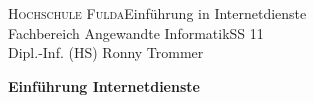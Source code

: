 \documentclass[a4paper,11pt]{article}
\begin{document}

\textsc{Hochschule Fulda}{\small\hfill Einführung in Internetdienste}\\
{\small Fachbereich Angewandte Informatik{\small\hfill SS 11}\\
Dipl.-Inf. (HS) Ronny Trommer}\\

\begin{center}
{\Large\textbf{Einführung Internetdienste}}\\

\medskip
\end{center}

\smallskip

\newcommand{\half}{{\scriptstyle\frac{1}{2}}}

\newcommand{\setK}{\mathbbm{K}}
\newcommand{\setR}{\mathbbm{R}}
\newcommand{\setZ}{\mathbbm{Z}}
\tableofcontents

\pagebreak


\end{document}
